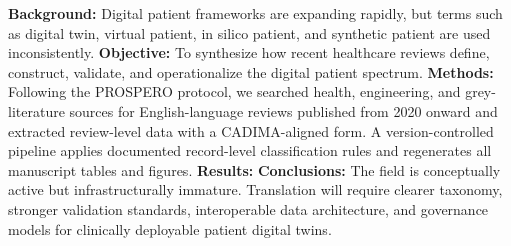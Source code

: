 \textbf{Background:} Digital patient frameworks are expanding rapidly, but terms such as digital twin, virtual patient, in silico patient, and synthetic patient are used inconsistently.
\textbf{Objective:} To synthesize how recent healthcare reviews define, construct, validate, and operationalize the digital patient spectrum.
\textbf{Methods:} Following the PROSPERO protocol, we searched health, engineering, and grey-literature sources for English-language reviews published from 2020 onward and extracted review-level data with a CADIMA-aligned form. A version-controlled pipeline applies documented record-level classification rules and regenerates all manuscript tables and figures.
\textbf{Results:} 
\textbf{Conclusions:} The field is conceptually active but infrastructurally immature. Translation will require clearer taxonomy, stronger validation standards, interoperable data architecture, and governance models for clinically deployable patient digital twins.
